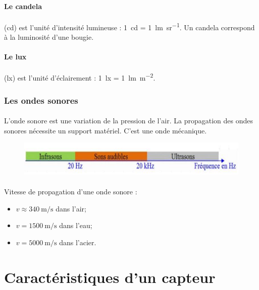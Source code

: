 \documentclass{article}
\begin{document}
                \paragraph{Le candela} (\si{\candela}) est l'unité d'intensité lumineuse : \SI{1}{\candela} = \SI{1}{\lumen \per \steradian}. Un candela correspond à la luminosité d'une bougie.
                \paragraph{Le lux} (\si{\lux}) est l'unité d'éclairement : \SI{1}{\lux} = \SI{1}{\lumen \per \square \meter}.

            \subsubsection{Les ondes sonores}
                \paragraph{}
                L'onde sonore est une variation de la pression de l'air. La propagation des ondes sonores nécessite un support matériel. C'est une onde mécanique.


                \begin{figure}[H]
                    \centering
                    \includegraphics[width=0.6\linewidth]{./images/020-ondes-sonores.png}
                \end{figure}

                \paragraph{}
                Vitesse de propagation d'une onde sonore :
                \begin{itemize}
                    \item $v \approx \SI{340}{\meter \per \second}$ dans l'air;
                    \item $v = \SI{1500}{\meter \per \second}$ dans l'eau;
                    \item $v = \SI{5000}{\meter \per \second}$ dans l'acier.
                \end{itemize}


    \newpage
    \section{Caractéristiques d'un capteur}
\end{document}
